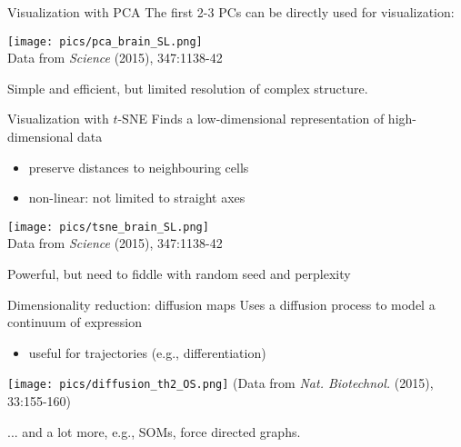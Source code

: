 \documentclass{beamer}
\begin{document}

\begin{frame}{Visualization with PCA}
The first 2-3 PCs can be directly used for visualization:
\begin{center}
    \texttt{[image: pics/pca\_brain\_SL.png]} \\
    {\tiny Data from \textit{Science} (2015), 347:1138-42}
\end{center}
Simple and efficient, but limited resolution of complex structure.
\end{frame}

\begin{frame}{Visualization with $t$-SNE}
Finds a low-dimensional representation of high-dimensional data 
\begin{itemize}
    \item preserve distances to neighbouring cells
    \item non-linear: not limited to straight axes
\end{itemize}
\begin{center}
    \texttt{[image: pics/tsne\_brain\_SL.png]} \\
    {\tiny Data from \textit{Science} (2015), 347:1138-42}
\end{center}
Powerful, but need to fiddle with random seed and perplexity
\end{frame}

\begin{frame}{Dimensionality reduction: diffusion maps}
Uses a diffusion process to model a continuum of expression
\begin{itemize}
    \item useful for trajectories (e.g., differentiation)
\end{itemize}
\begin{center}
    \texttt{[image: pics/diffusion\_th2\_OS.png]} 
    {\tiny (Data from \emph{Nat. Biotechnol.} (2015), 33:155-160)}
\end{center}
... and a lot more, e.g., SOMs, force directed graphs.
\end{frame}
\end{document}
